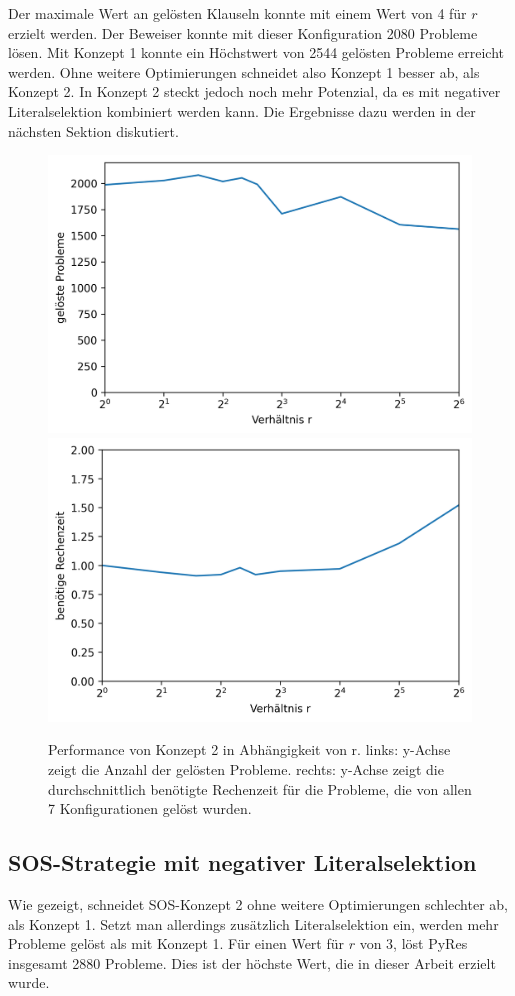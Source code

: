 	Der maximale Wert an gelösten Klauseln konnte mit einem Wert von 4 für $r$ erzielt werden. Der Beweiser konnte mit dieser Konfiguration 2080 Probleme lösen. Mit Konzept 1 konnte ein Höchstwert von 2544 gelösten Probleme erreicht werden. Ohne weitere Optimierungen schneidet also Konzept 1 besser ab, als Konzept 2. In Konzept 2 steckt jedoch noch mehr Potenzial, da es mit negativer Literalselektion kombiniert werden kann. Die Ergebnisse dazu werden in der nächsten Sektion diskutiert.
	\begin{figure}
		\centering
		\includegraphics[width=0.45\linewidth]{images/Diagram/RWert}
		\includegraphics[width=0.45\linewidth]{images/Diagram/RWert2}
		\caption[Performance von Konzept 2 in Abhängigkeit von r]{Performance von Konzept 2 in Abhängigkeit von r. links: y-Achse zeigt die Anzahl der gelösten Probleme. rechts: y-Achse zeigt die durchschnittlich benötigte Rechenzeit für die Probleme, die von allen 7 Konfigurationen gelöst wurden.}
		\label{fig:rwert}
	\end{figure}
	
	
	\subsection{SOS-Strategie mit negativer Literalselektion}
	Wie gezeigt, schneidet SOS-Konzept 2 ohne weitere Optimierungen schlechter ab, als Konzept 1. Setzt man allerdings zusätzlich Literalselektion ein, werden mehr Probleme gelöst als mit Konzept 1.
	Für einen Wert für $r$ von 3, löst PyRes insgesamt 2880 Probleme. Dies ist der höchste Wert, die in dieser Arbeit erzielt wurde. 
	
